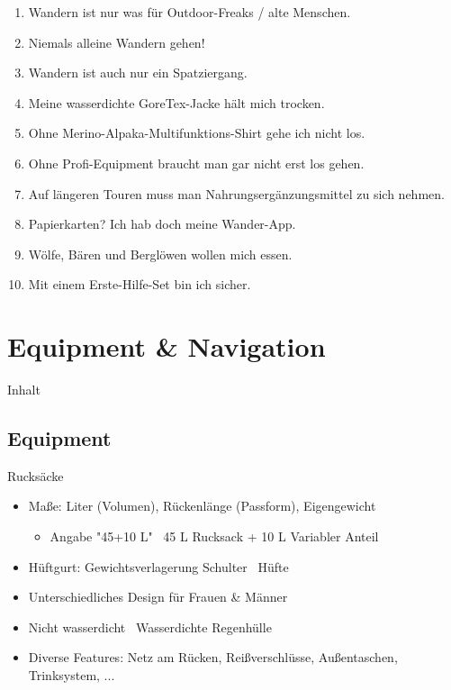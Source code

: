 \documentclass{beamer}
\begin{document}
			\begin{frame}{}
				\begin{enumerate}
					\item Wandern ist nur was für Outdoor-Freaks / alte Menschen.\pause
					\item Niemals alleine Wandern gehen!\pause
					\item Wandern ist auch nur ein Spatziergang.\pause
					\item Meine wasserdichte GoreTex-Jacke hält mich trocken.\pause
					\item Ohne Merino-Alpaka-Multifunktions-Shirt gehe ich nicht los.\pause
					\item Ohne Profi-Equipment braucht man gar nicht erst los gehen.\pause
					\item Auf längeren Touren muss man Nahrungsergänzungsmittel zu sich nehmen.\pause
					\item Papierkarten? Ich hab doch meine Wander-App.\pause
					\item Wölfe, Bären und Berglöwen wollen mich essen.\pause
					\item Mit einem Erste-Hilfe-Set bin ich sicher.
				\end{enumerate}
			\end{frame}
			
	\section{Equipment \& Navigation}
		
		\begin{frame}[t]{Inhalt}
		\end{frame}
		
		\subsection{Equipment}
		
			\begin{frame}{Rucksäcke}
				\begin{itemize}
					\item Maße: Liter (Volumen), Rückenlänge (Passform), Eigengewicht
					\begin{itemize}
						\item Angabe "45+10 L" \textrightarrow\ 45 L Rucksack + 10 L Variabler Anteil
					\end{itemize}\pause
					\item Hüftgurt: Gewichtsverlagerung Schulter \textrightarrow\ Hüfte\pause
					\item Unterschiedliches Design für Frauen \& Männer\pause
					\item Nicht wasserdicht \textrightarrow\ Wasserdichte Regenhülle\pause
					\item Diverse Features: Netz am Rücken, Reißverschlüsse, Außentaschen, Trinksystem, ...
				\end{itemize}
			\end{frame}
			
\end{document}
